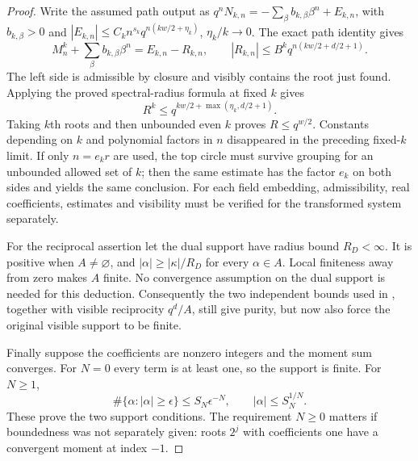 \begin{proof}
Write the assumed path output as
$q^nN_{k,n}=-\sum_\beta b_{k,\beta}\beta^n+E_{k,n}$, with
$b_{k,\beta}>0$ and
$|E_{k,n}|\le C_kn^{s_k}q^{n(kw/2+\eta_k)}$,
$\eta_k/k\to0$. The exact path identity gives
\[
 M_n^k+\sum_\beta b_{k,\beta}\beta^n=E_{k,n}-R_{k,n},\qquad
 |R_{k,n}|\le B^kq^{n(kw/2+d/2+1)}.
\]
The left side is admissible by closure and visibly contains the root
just found. Applying the proved spectral-radius formula at fixed $k$
gives
\[
 R^k\le q^{kw/2+\max(\eta_k,d/2+1)}.
\]
Taking $k$th roots and then unbounded even $k$ proves
$R\le q^{w/2}$. Constants depending on $k$ and polynomial factors
in $n$ disappeared in the preceding fixed-$k$ limit. If only
$n=e_kr$ are used, the top circle must survive grouping for an unbounded
allowed set of $k$; then the same estimate has the factor $e_k$ on
both sides and yields the same conclusion. For each field embedding,
admissibility, real coefficients, estimates and visibility must be
verified for the transformed system separately.

For the reciprocal assertion let the dual support have radius bound
$R_D<\infty$. It is positive when $A\ne\varnothing$, and
$|\alpha|\ge |\kappa|/R_D$ for every $\alpha\in A$.
Local finiteness away from zero makes $A$ finite. No convergence
assumption on the dual support is needed for this deduction.
Consequently the two independent bounds used in , together
with visible reciprocity $q^d/A$, still give purity, but now also
force the original visible support to be finite.

Finally suppose the coefficients are nonzero integers and the moment
sum converges. For $N=0$ every term is at least one, so the support is
finite. For $N\ge1$,
\[
 \#\{\alpha:|\alpha|\ge\epsilon\}\le S_N\epsilon^{-N},\qquad
 |\alpha|\le S_N^{1/N}.
\]
These prove the two support conditions. The requirement $N\ge0$
matters if boundedness was not separately given: roots $2^j$ with
coefficients one have a convergent moment at index $-1$.
\end{proof}

